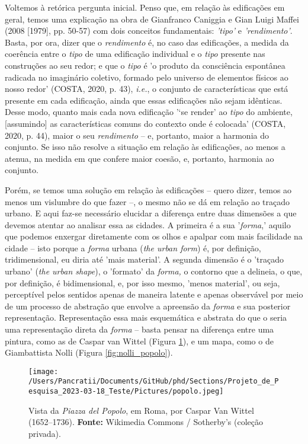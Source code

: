\documentclass[]{report}
\begin{document}
Voltemos à retórica pergunta inicial. Penso que, em relação às edificações em geral, temos uma explicação na obra de Gianfranco Caniggia e Gian Luigi Maffei (2008 [1979], pp. 50-57) com dois conceitos fundamentais: \textit{'tipo'} e \textit{'rendimento'}. Basta, por ora, dizer que o \textit{rendimento} é, no caso das edificações, a medida da coerência entre o \textit{tipo} de uma edificação individual e o \textit{tipo} presente nas construções ao seu redor; e que o \textit{tipo} é 'o produto da consciência espontânea radicada no imaginário coletivo, formado pelo universo de elementos físicos ao nosso redor' (COSTA, 2020, p. 43), \textit{i.e.}, o conjunto de características que está presente em cada edificação, ainda que essas edificações não sejam idênticas. Desse modo, quanto mais cada nova edificação '‘se render’ ao \textit{tipo} do ambiente, [assumindo] as características comuns do contexto onde é colocada' (COSTA, 2020, p. 44), maior o seu \textit{rendimento} – e, portanto, maior a harmonia do conjunto. Se isso não resolve a situação em relação às edificações, ao menos a atenua, na medida em que confere maior coesão, e, portanto, harmonia ao conjunto.

Porém, se temos uma solução em relação às edificações – quero dizer, temos ao menos um vislumbre do que fazer –, o mesmo não se dá em relação ao traçado urbano. E aqui faz-se necessário elucidar a diferença entre duas dimensões a que devemos atentar ao analisar essa as cidades. A primeira é a sua '\textit{forma},' aquilo que podemos enxergar diretamente com os olhos e apalpar com mais facilidade na cidade – isto porque a \textit{forma} urbana (\textit{the urban form}) é, por definição, tridimensional, eu diria até 'mais material'. A segunda dimensão é o 'traçado urbano' (\textit{the urban shape}), o 'formato' da \textit{forma,} o contorno que a delineia, o que, por definição, é bidimensional, e, por isso mesmo, 'menos material', ou seja, perceptível pelos sentidos apenas de maneira latente e apenas observável por meio de um processo de abstração que envolve a apreensão da \textit{forma} e sua posterior representação. Representação essa mais esquemática e abstrata do que o seria uma representação direta da \textit{forma} – basta pensar na diferença entre uma pintura, como as de Caspar van Wittel (Figura \ref{fig:popolo}), e um mapa, como o de Giambattista Nolli (Figura \ref{fig:nolli_popolo}).

\begin{figure}[h]
	\centering
	\texttt{[image: /Users/Pancratii/Documents/GitHub/phd/Sections/Projeto\_de\_Pesquisa\_2023-03-18\_Teste/Pictures/popolo.jpeg]} 
	\captionsetup{labelfont=bf}
	\caption{Vista da \textit{Piazza del Popolo}, em Roma, por Caspar Van Wittel (1652–1736). \textbf{Fonte:} Wikimedia Commons / Sotherby's (coleção privada).}
	\label{fig:popolo}
\end{figure}   
\end{document}
